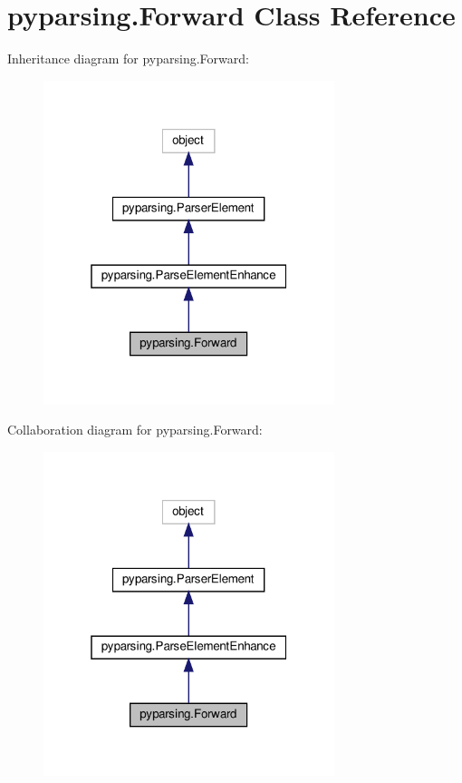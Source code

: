 \hypertarget{classpyparsing_1_1Forward}{}\section{pyparsing.\+Forward Class Reference}
\label{classpyparsing_1_1Forward}


Inheritance diagram for pyparsing.\+Forward\+:
\nopagebreak
\begin{figure}[H]
\begin{center}
\leavevmode
\includegraphics[width=241pt]{classpyparsing_1_1Forward__inherit__graph}
\end{center}
\end{figure}


Collaboration diagram for pyparsing.\+Forward\+:
\nopagebreak
\begin{figure}[H]
\begin{center}
\leavevmode
\includegraphics[width=241pt]{classpyparsing_1_1Forward__coll__graph}
\end{center}
\end{figure}
